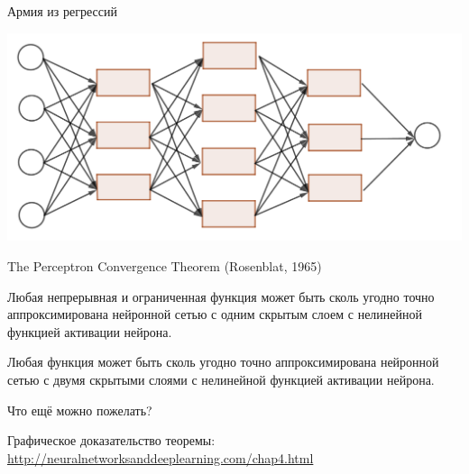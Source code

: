 \documentclass[notes,12pt, aspectratio=169]{beamer}
\newenvironment{wideitemize}{\itemize\addtolength{\itemsep}{10pt}}{\enditemize}
\begin{document}
\begin{frame}{Армия из регрессий}
	\begin{center}
		\includegraphics[width=0.8\paperwidth]{network.png}
	\end{center}
\end{frame}


\begin{frame}{The Perceptron Convergence Theorem (Rosenblat, 1965)}
	\begin{wideitemize}
		\item Любая непрерывная и ограниченная функция может быть сколь угодно точно аппроксимирована нейронной сетью с одним скрытым слоем с нелинейной функцией активации нейрона.
		
		\item Любая функция может быть сколь угодно точно аппроксимирована нейронной сетью с двумя скрытыми слоями с нелинейной функцией активации нейрона.
		
		\item Что ещё можно пожелать?
	\end{wideitemize}

\vfill %
\footnotesize Графическое доказательство теоремы:  \\
\color{blue} \url{http://neuralnetworksanddeeplearning.com/chap4.html}
\end{frame}
\end{document}
